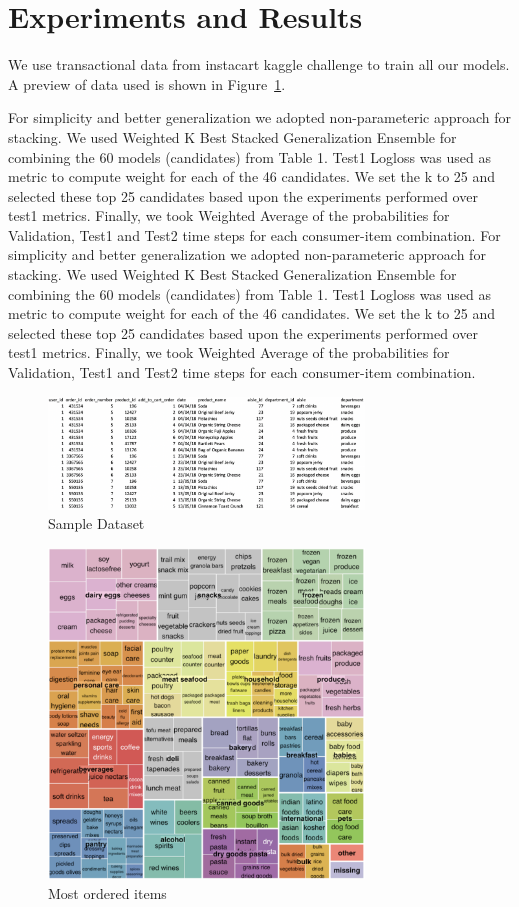 \section{Experiments and Results}
We use transactional data from instacart kaggle challenge to train all our models. A preview of data used is 
shown in Figure~\ref{fig:sampledata}. 

For simplicity and better generalization we adopted non-parameteric approach for stacking.
We used Weighted K Best Stacked Generalization Ensemble for combining the 60 models (candidates) from Table 1. 
Test1 Logloss was used as metric to compute weight for each of the 46 candidates. We set the k to 25 and selected 
these top 25 candidates based upon the experiments performed over test1 metrics. Finally, we took Weighted Average of 
the probabilities for Validation, Test1 and Test2 time steps for each consumer-item combination.
For simplicity and better generalization we adopted non-parameteric approach for stacking.
We used Weighted K Best Stacked Generalization Ensemble for combining the 60 models (candidates) from Table 1. 
Test1 Logloss was used as metric to compute weight for each of the 46 candidates. We set the k to 25 and selected 
these top 25 candidates based upon the experiments performed over test1 metrics. Finally, we took Weighted Average of 
the probabilities for Validation, Test1 and Test2 time steps for each consumer-item combination.

 \begin{figure}[t]
    \centering 
    \includegraphics[width=3.3in]{img/sampledata.png} 
    \caption{Sample Dataset} 
    \label{fig:sampledata} 
  \end{figure}

  \begin{figure}[t]
    \centering 
    \includegraphics[width=3.3in]{img/items.png} 
    \caption{Most ordered items} 
    \label{fig:items} 
  \end{figure}

